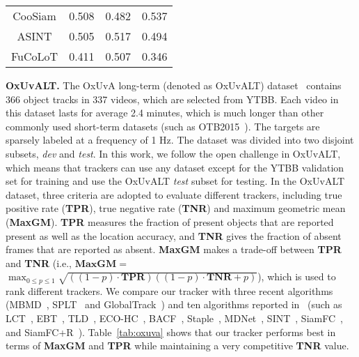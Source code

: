 \documentclass[10pt,twocolumn,letterpaper]{article}
\begin{document}
\begin{table}[h]
\begin{center}
\begin{tabular}{cccc}
CooSiam          & 0.508                                 & 0.482                                 & 0.537                                 \\
ASINT             & 0.505                                 & 0.517                                 & 0.494                                \\
FuCoLoT          & 0.411                                 & 0.507                                 & 0.346                                \\
\hline
\end{tabular}
\end{center}
\vspace{-4mm}
\end{table}


\noindent \textbf{OxUvALT.} The OxUvA long-term (denoted as OxUvALT) dataset~\cite{OxUvA}
contains 366 object tracks in 337 videos, which are selected from YTBB. Each video in this dataset
lasts for average 2.4 minutes, which is much longer than other commonly used short-term datasets
(such as OTB2015~\cite{OTB2015}).
The targets are sparsely labeled at a frequency of 1 Hz.
The dataset was divided into two disjoint subsets, \emph{dev} and \emph{test}.
In this work, we follow the open challenge in OxUvALT, which means that trackers can use any dataset
except for the YTBB validation set for training and use the OxUvALT \emph{test} subset for testing.
In the OxUvALT dataset, three criteria are adopted to evaluate different trackers, including true positive rate
(\textbf{TPR}), true negative rate (\textbf{TNR}) and maximum geometric mean (\textbf{MaxGM}).
\textbf{TPR} measures the fraction of present objects that are reported present as well
as the location accuracy, and \textbf{TNR} gives the fraction of absent frames that are reported as absent.
\textbf{MaxGM} makes a trade-off between \textbf{TPR} and \textbf{TNR} (i.e., $\mathbf{M a x G M}=$
$\max _{0 \leq p \leq 1} \sqrt{((1-p) \cdot \mathbf{T} \mathbf{P} \mathbf{R})((1-p) \cdot \mathbf{T}
\mathbf{N} \mathbf{R}+p)}$), which is used to rank different trackers.
We compare our tracker with three recent algorithms (MBMD~\cite{Zhang-VOT18-MBMD},
SPLT~\cite{Yan-ICCV19-SPLT} and GlobalTrack~\cite{GlobalTrack}) and ten algorithms reported
in~\cite{OxUvA} (such as LCT~\cite{LCT}, EBT~\cite{EBT}, TLD~\cite{TLD},
ECO-HC~\cite{Danelljan-CVPR17-ECO}, BACF~\cite{BACF}, Staple~\cite{Staple},
MDNet~\cite{Nam-CVPR16-MDNet}, SINT~\cite{SINT}, SiamFC~\cite{SiameseFC},
and SiamFC+R~\cite{OxUvA}).
Table~\ref{tab:oxuva} shows that our tracker performs best in terms of \textbf{MaxGM} and \textbf{TPR}
while maintaining a very competitive \textbf{TNR} value.
\end{document}
